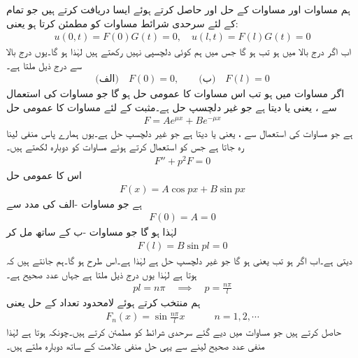  \quad  ہم مساوات  اور مساوات  کے حل  اور  حاصل کرتے ہوئے ایسا  دریافت کرتے ہیں جو تمام  کے لئے سرحدی شرائط مساوات  کو مطمئن کرتا ہو یعنی:
\begin{align*}
u(0,t)=F(0)G(t)=0,\quad u(l,t)=F(l)G(t)=0
\end{align*}
اب اگر درج بالا میں   ہو تب  ہو گا جس میں ہم کوئی دلچسپی نہیں رکھتے ہیں لہٰذا  ہو گا۔یوں درج بالا سے درج ذیل ملتا ہے۔
\begin{align}\label{مساوات_جزوی_مساوات_موج_چ}
\text{(الف)}\quad F(0)=0,\quad \quad \text{(ب)}\quad F(l)=0
\end{align}
اگر مساوات  میں  ہو تب اس مساوات کا عمومی حل  ہو گا جو مساوات  کی استعمال سے ،  یعنی  یا  دیتا ہے جو غیر دلچسپ حل ہے۔مثبت  کے لئے مساوات  کا عمومی حل
\begin{align*}
F=Ae^{\mu x}+Be^{-\mu x}
\end{align*}
ہے جو مساوات  کی استعمال سے ،  یعنی  یا  دیتا ہے جو غیر دلچسپ حل ہے۔یوں ہمارے پاس منفی  لینا رہ جاتا ہے جس کو استعمال کرتے ہوئے مساوات  کو دوبارہ لکھتے ہیں۔
\begin{align*}
F''+p^2F=0
\end{align*}
اس کا عمومی حل
\begin{align*}
F(x)=A\cos px+B\sin px
\end{align*}
ہے جو مساوات -الف کی مدد سے
\begin{align*}
F(0)=A=0
\end{align*}
لہٰذا  ہو گا جو مساوات -ب کے ساتھ مل کر
\begin{align*}
F(l)=B\sin pl=0
\end{align*}
دیتی ہے۔اب اگر  ہو تب  یعنی  ہو گا جو غیر دلچسپ حل ہے لہٰذا  ہے۔اس طرح  ہو گا۔ہم جانتے ہیں کہ  ہوتا ہے لہٰذا یوں درج ذیل ملتا ہے جہاں  عدد صحیح ہے۔
\begin{align}\label{مساوات_جزوی_مساوات_موج_ح}
pl=n\pi \quad \implies \quad p=\frac{n\pi}{l}
\end{align}
ہم  منتخب کرتے ہوئے لامحدود تعداد کے حل  یعنی
\begin{align}\label{مساوات_جزوی_مساوات_موج_خ}
F_n(x)=\sin \frac{n\pi}{l}x\quad \quad \quad  n=1,2,\cdots
\end{align}
حاصل کرتے ہیں جو مساوات  میں دیے گئے سرحدی شرائط کو مطمئن کرتے ہیں۔چونکہ  ہوتا ہے لہٰذا  منفی عدد صحیح  لینے سے  یہی حل منفی علامت کے ساتھ دوبارہ ملتے ہیں۔


